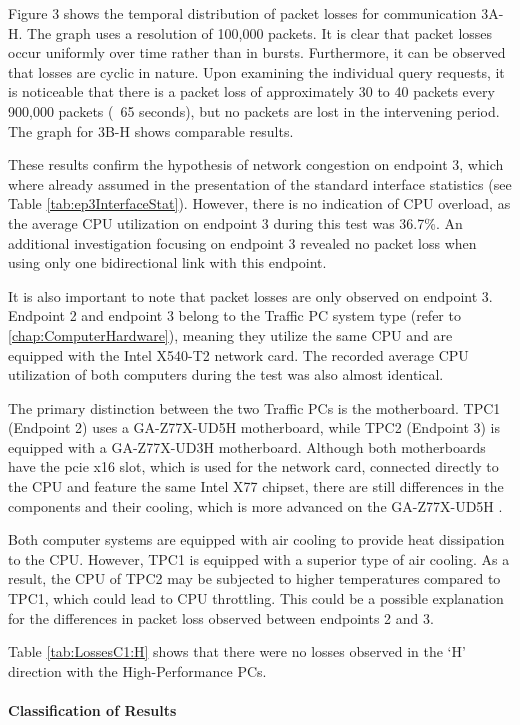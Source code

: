 Figure 3 shows the temporal distribution of packet losses for communication 3A-H. The graph uses a resolution of 100,000 packets.  It is clear that packet losses occur uniformly over time rather than in bursts. Furthermore, it can be observed that losses are cyclic in nature. Upon examining the individual query requests, it is noticeable that there is a packet loss of approximately 30 to 40 packets every 900,000 packets (~65 seconds), but no packets are lost in the intervening period. The graph for 3B-H shows comparable results.

These results confirm the hypothesis of network congestion on endpoint 3, which where already assumed in the presentation of the standard interface statistics (see Table \ref{tab:ep3InterfaceStat}). However, there is no indication of CPU overload, as the average CPU utilization on endpoint 3 during this test was 36.7\%. An additional investigation focusing on endpoint 3 revealed no packet loss when using only one bidirectional link with this endpoint.

It is also important to note that packet losses are only observed on endpoint 3. Endpoint 2 and endpoint 3 belong to the Traffic PC system type (refer to \ref{chap:ComputerHardware}), meaning they utilize the same CPU and are equipped with the Intel X540-T2 network card. The recorded average CPU utilization of both computers during the test  was also almost identical.

The primary distinction between the two Traffic PCs is the motherboard. TPC1 (Endpoint 2) uses a GA-Z77X-UD5H motherboard, while TPC2 (Endpoint 3) is equipped with a GA-Z77X-UD3H motherboard. Although both motherboards have the \ac{pcie} x16 slot, which is used for the network card, connected directly to the CPU and feature the same Intel X77 chipset, there are still differences in the components and their cooling, which is more advanced on the GA-Z77X-UD5H \cite{reli04, reli05}.

Both computer systems are equipped with air cooling to provide heat dissipation to the CPU. However, TPC1 is equipped with a superior type of air cooling. As a result, the CPU of TPC2 may be subjected to higher temperatures compared to TPC1, which could lead to CPU throttling. This could be a possible explanation for the differences in packet loss observed between endpoints 2 and 3.

Table \ref{tab:LossesC1:H} shows that there were no losses observed in the `H' direction with the High-Performance PCs.

\paragraph{Classification of Results}

